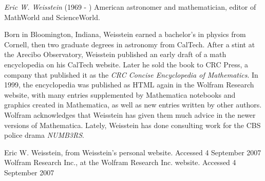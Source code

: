 \documentclass[12pt]{article}
\begin{document}

\emph{Eric W. Weisstein} (1969 - ) American astronomer and mathematician, editor of MathWorld and ScienceWorld.

Born in Bloomington, Indiana, Weisstein earned a bachelor's in physics from Cornell, then two graduate degrees in astronomy from CalTech. After a stint at the Arecibo Observatory, Weisstein published an early draft of a math encyclopedia on his CalTech website. Later he sold the book to CRC Press, a company that published it as the {\it CRC Concise Encyclopedia of Mathematics}. In 1999, the encyclopedia was published as HTML again in the Wolfram Research website, with many entries supplemented by Mathematica notebooks and graphics created in Mathematica, as well as new entries written by other authors. Wolfram acknowledges that Weisstein has given them much advice in the newer versions of Mathematica. Lately, Weisstein has done consulting work for the CBS police drama {\it NUMB3RS}.

\begin{thebibliography}{2}
 Eric W. Weisstein,  from Weisstein's personal website. Accessed 4 September 2007
 Wolfram Research Inc.,  at the Wolfram Research Inc. website. Accessed 4 September 2007
\end{thebibliography}
\end{document}
